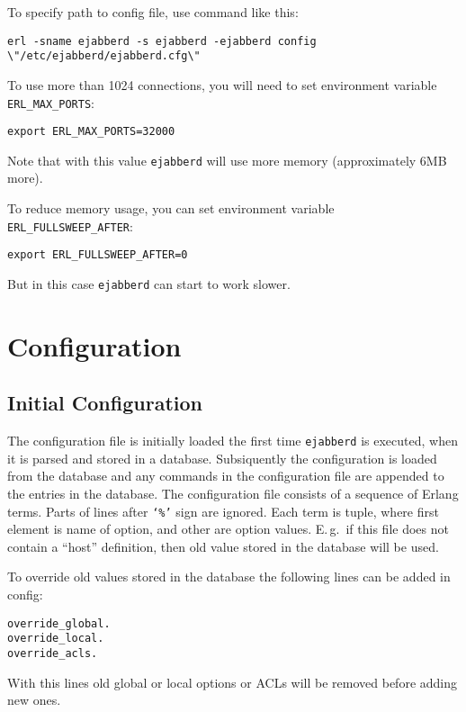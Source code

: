 \documentclass[10pt]{article}
\newcommand{\ejabberd}{\texttt{ejabberd}}
\begin{document}
To specify path to config file, use command like this:
\begin{verbatim}
erl -sname ejabberd -s ejabberd -ejabberd config \"/etc/ejabberd/ejabberd.cfg\"
\end{verbatim}


To use more than 1024 connections, you will need to set environment variable
\verb|ERL_MAX_PORTS|:
\begin{verbatim}
export ERL_MAX_PORTS=32000
\end{verbatim}
Note that with this value \ejabberd{} will use more memory (approximately 6MB
more).

To reduce memory usage, you can set environment variable
\verb|ERL_FULLSWEEP_AFTER|:
\begin{verbatim}
export ERL_FULLSWEEP_AFTER=0
\end{verbatim}
But in this case \ejabberd{} can start to work slower.




\section{Configuration}
\label{sec:configuration}

\subsection{Initial Configuration}
\label{sec:initconfig}

%

The configuration file is initially loaded the first time \ejabberd{} is
executed, when it is parsed and stored in a database.  Subsiquently the
configuration is loaded from the database and any commands in the configuration
file are appended to the entries in the database.  The configuration file
consists of a sequence of Erlang terms. Parts of lines after \texttt{`\%'} sign
are ignored.  Each term is tuple, where first element is name of option, and
other are option values. E.\,g.\ if this file does not contain a ``host''
definition, then old value stored in the database will be used.


To override old values stored in the database the following lines can be added
in config:
\begin{verbatim}
override_global.
override_local.
override_acls.
\end{verbatim}
With this lines old global or local options or ACLs will be removed before
adding new ones.
\end{document}
